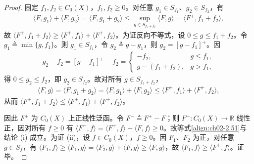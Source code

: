 \documentclass[../../main.tex]{subfiles}%
\begin{document}
\begin{proof}
固定 $f_1,f_2\in C_0(X)$，$f_1,f_2\geqslant0$。对任意 $g_1\in S_{f_1}$、$g_2\in S_{f_2}$，有
\begin{align*}
\langle F,g_1\rangle+\langle F,g_2\rangle=\langle F,g_1+g_2\rangle
\leqslant\sup_{g\in S_{f_1+f_2}}\langle F,g\rangle=\langle F^+,f_1+f_2\rangle,
\end{align*}
故 $\langle F^+,f_1+f_2\rangle\geqslant\langle F^+,f_1\rangle+\langle F^+,f_2\rangle$。为证反向不等式，设 $0\leqslant g\leqslant f_1+f_2$。令 $g_1\triangleq \min\{g,f_1\}$。则 $g_1\in S_{f_1}$，令 $g_2\triangleq g-g_1$，则 $g_2=[g-f_1]^+$。因
\begin{align*}
g_2-f_2=[g-f_1]^+-f_2=
\begin{cases}
-f_2, & g\leqslant f_1,\\
g-(f_1+f_2), & g>f_1,
\end{cases}
\end{align*}
得 $0\leqslant g_2\leqslant f_2$，即 $g_2\in S_{f_2}$。故对所有 $g\in S_{f_1+f_2}$，
\begin{align*}
\langle F,g\rangle=\langle F,g_1+g_2\rangle=\langle F,g_1\rangle+\langle F,g_2\rangle
\leqslant\langle F^+,f_1\rangle+\langle F^+,f_2\rangle,
\end{align*}
从而 $\langle F^+,f_1+f_2\rangle\leqslant\langle F^+,f_1\rangle+\langle F^+,f_2\rangle$。

因此 $F^+$ 为 $C_0(X)$ 上正线性泛函。令 $F^-\triangleq F^+-F$；则 $F^-:C_0(X)\to\mathbb R$ 线性正，因对所有 $f\geqslant0$ 有 $\langle F^-,f\rangle=\langle F^+,f\rangle-\langle F,f\rangle\geqslant0$。故等式\eqref{align:ch02-2.51}与结论 (i) 成立。为证 (ii)，设 $f\in C_0(X)$，$f\geqslant0$。因 $F_1$、$F_2$ 为正，对任意 $g\in S_f$，有 $\langle F_1,f\rangle\geqslant\langle F_1,g\rangle=\langle F_2,g\rangle+\langle F,g\rangle\geqslant\langle F,g\rangle$，故 $\langle F_1,f\rangle\geqslant\langle F^+,f\rangle$。证毕。
\end{proof}
\end{document}
